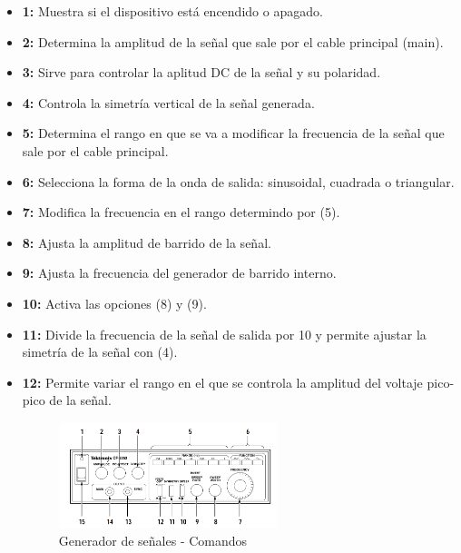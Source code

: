 \documentclass[12pt]{article}
\begin{document}
\begin{itemize}
	\item \textbf{1:} Muestra si el dispositivo está encendido o apagado.
	\item \textbf{2:} Determina la amplitud de la señal que sale por el cable principal (main).
	\item \textbf{3:} Sirve para controlar la aplitud DC de la señal y su polaridad.
	\item \textbf{4:} Controla la simetría vertical de la señal generada.
	\item \textbf{5:} Determina el rango en que se va a modificar la frecuencia de la señal que sale por el cable principal.
	\item \textbf{6:} Selecciona la forma de la onda de salida: sinusoidal, cuadrada o triangular.
	\item \textbf{7:} Modifica la frecuencia en el rango determindo por (5).
	\item \textbf{8:} Ajusta la amplitud de barrido de la señal.
	\item \textbf{9:} Ajusta la frecuencia del generador de barrido interno.
	\item \textbf{10:} Activa las opciones (8) y (9).
	\item \textbf{11:} Divide la frecuencia de la señal de salida por 10 y permite ajustar la simetría de la señal con (4).
	\item \textbf{12:} Permite variar el rango en el que se controla la amplitud del voltaje pico-pico de la señal.

\begin{figure}[h!]
	\centering
	\includegraphics[width=0.60\textwidth,height=0.25\textheight]{Generador-Funciones}
	\caption{Generador de señales - Comandos}
\end{figure}




\end{itemize}
	
	
\end{document}
